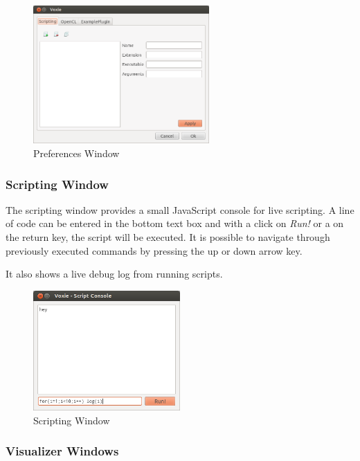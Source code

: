 \begin{figure}[h]
	\caption{Preferences Window}
	\centering
	\includegraphics[width=0.6\textwidth]{img/preferences-script.png}
\end{figure}

\subsubsection{Scripting Window}
\label{scripting-window}

The scripting window provides a small JavaScript console for live scripting.
A line of code can be entered in the bottom text box and with a click on \emph{Run!}
or a on the return key, the script will be executed.
It is possible to navigate through previously executed commands by pressing the up or
down arrow key.

It also shows a live debug log from running scripts.

\begin{figure}[h]
	\caption{Scripting Window}
	\centering
	\includegraphics[width=0.5\textwidth]{img/script-console.png}
\end{figure}


\subsubsection{Visualizer Windows}


